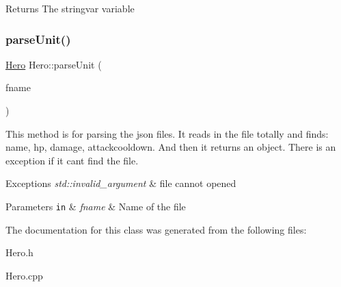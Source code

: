\begin{DoxyReturn}{Returns}
The stringvar variable 
\end{DoxyReturn}
\mbox{\label{classHero_a5a40a729874f0646e5f26027d92a98a1}} 
\subsubsection{\texorpdfstring{parse\+Unit()}{parseUnit()}}
{\footnotesize\ttfamily \hyperlink{classHero}{Hero} Hero\+::parse\+Unit (\begin{DoxyParamCaption}\item[{std\+::string}]{fname }\end{DoxyParamCaption})\hspace{0.3cm}{\ttfamily [static]}}



This method is for parsing the json files. It reads in the file totally and finds\+: name, hp, damage, attackcooldown. And then it returns an object. There is an exception if it can\textquotesingle{}t find the file. 


\begin{DoxyExceptions}{Exceptions}
{\em std\+::invalid\+\_\+argument} & file cannot opened \\
\hline
\end{DoxyExceptions}

\begin{DoxyParams}[1]{Parameters}
\mbox{\tt in}  & {\em fname} & Name of the file \\
\hline
\end{DoxyParams}


The documentation for this class was generated from the following files\+:\begin{DoxyCompactItemize}
\item 
Hero.\+h\item 
Hero.\+cpp\end{DoxyCompactItemize}
